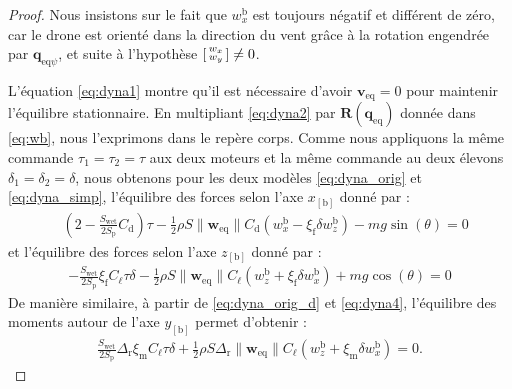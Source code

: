 \begin{proof}
        Nous insistons sur le fait que $w_{x}^{\text{b}}$ est toujours négatif et différent de zéro, car le drone est orienté dans la direction du vent grâce à la rotation engendrée par $ \boldsymbol{q}_{\mathrm{eq}\psi}$, et suite à l'hypothèse $\left[ \begin{smallmatrix}w_x \\ w_y \end{smallmatrix} \right] \neq 0$.
    
        L'équation \eqref{eq:dyna1} montre qu'il est nécessaire d'avoir $\boldsymbol{v}_{\text{eq}} = 0$ pour maintenir l'équilibre stationnaire. En multipliant \eqref{eq:dyna2} par $\boldsymbol{R}(\boldsymbol{q}_{\text{eq}})$ donnée dans  \eqref{eq:wb}, nous l'exprimons dans le repère corps.
        Comme nous appliquons la même commande $\tau_{1} = \tau_{2} = \tau $ aux deux moteurs et la même commande au deux élevons $\delta_{1} = \delta_{2} = \delta$, nous obtenons pour les deux modèles \eqref{eq:dyna_orig} et \eqref{eq:dyna_simp}, l'équilibre des forces selon l'axe $x_{[\text{b}]}$ donné par :
        \begin{align}
            & (2-\frac{S_{\text{wet}}}{2S_{\text{p}}} C_{\text{d}})\tau - \frac{1}{2}\rho S \lVert \boldsymbol{w}_{\mathrm{eq}} \rVert C_{\text{d}} \left(w_{x}^{\text{b}} - \xi_{\text{f}} \delta w_{z}^{\text{b}} \right) - mg \sin(\theta) = 0 \label{eq:forcex}
        \end{align}
        et l'équilibre des forces selon l'axe $z_{[\text{b}]}$ donné par : 
        \begin{align}\label{eq:forcez}
            - \frac{S_{\text{wet}}}{2S_{\text{p}}}\xi_{\text{f}} C_{\ell} \tau \delta - \frac{1}{2}\rho S \lVert \boldsymbol{w}_{\mathrm{eq}} \rVert C_{\ell} \left(w_{z}^{\text{b}} + \xi_{\text{f}} \delta w_{x}^{\text{b}} \right) + mg \cos(\theta) = 0
        \end{align}
        De manière similaire, à partir de \eqref{eq:dyna_orig_d} et \eqref{eq:dyna4}, l'équilibre des moments autour de l'axe $y_{[\text{b}]}$ permet d'obtenir : 
        \begin{align}\label{eq:momenty}
            \frac{S_{\text{wet}}}{2S_{\text{p}}}  \Delta_{\text{r}} \xi_{\text{m}} C_{\ell} \tau \delta + \frac{1}{2}\rho S \Delta_{\text{r}} \lVert \boldsymbol{w}_{\mathrm{eq}} \rVert C_{\ell} \left(w_{z}^{\text{b}} + \xi_{\text{m}} \delta w_{x}^{\text{b}} \right) = 0.
        \end{align}
        

\end{proof}
